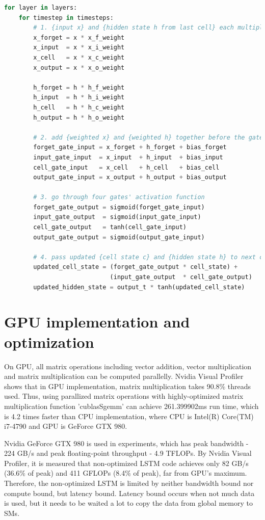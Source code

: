 \documentclass{article}
\begin{document}
\begin{lstlisting}[language=Python, caption=Pseudo code of LSTM implementation]
for layer in layers:
    for timestep in timesteps:
        # 1. {input x} and {hidden state h from last cell} each multiplies with four weight matrices corresponding to four gates
        x_forget = x * x_f_weight
        x_input  = x * x_i_weight
        x_cell   = x * x_c_weight
        x_output = x * x_o_weight
        
        h_forget = h * h_f_weight
        h_input  = h * h_i_weight
        h_cell   = h * h_c_weight
        h_output = h * h_o_weight
        
        # 2. add {weighted x} and {weighted h} together before the gates
        forget_gate_input = x_forget + h_forget + bias_forget
        input_gate_input  = x_input  + h_input  + bias_input
        cell_gate_input   = x_cell   + h_cell   + bias_cell
        output_gate_input = x_output + h_output + bias_output
        
        # 3. go through four gates' activation function
        forget_gate_output = sigmoid(forget_gate_input)
        input_gate_output  = sigmoid(input_gate_input)
        cell_gate_output   = tanh(cell_gate_input)
        output_gate_output = sigmoid(output_gate_input)
        
        # 4. pass updated {cell state c} and {hidden state h} to next cell on current layer
        updated_cell_state = (forget_gate_output * cell_state) + 
                             (input_gate_output  * cell_gate_output)
        updated_hidden_state = output_t * tanh(updated_cell_state)
\end{lstlisting}

\section{GPU implementation and optimization}


On GPU, all matrix operations including vector addition, vector multiplication and matrix multiplication can be computed parallelly. Nvidia Visual Profiler shows that in GPU implementation, matrix multiplication takes 90.8\% threads used. Thus, using parallized matrix operations with highly-optimized matrix multiplication function 'cublasSgemm' can achieve 261.399902ms run time, which is 4.2 times faster than CPU implementation, where CPU is Intel(R) Core(TM) i7-4790 and GPU is GeForce GTX 980. 

Nvidia GeForce GTX 980 is used in experiments, which has peak bandwidth - 224 GB/s and peak floating-point throughput - 4.9 TFLOPs. By Nvidia Visual Profiler, it is measured that non-optimized LSTM code achieves only 82 GB/s (36.6\% of peak) and 411 GFLOPs (8.4\% of peak), far from GPU's maximum. Therefore, the non-optimized LSTM is limited by neither bandwidth bound nor compute bound, but latency bound. Latency bound occurs when not much data is used, but it needs to be waited a lot to copy the data from global memory to SMs. 
\end{document}
